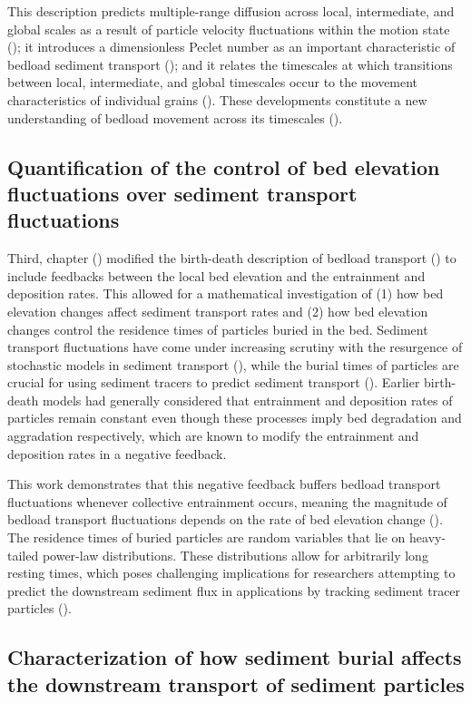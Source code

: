 This description predicts multiple-range diffusion across local, intermediate, and global scales as a result of particle velocity fluctuations within the motion state (); it introduces a dimensionless Peclet number as an important characteristic of bedload sediment transport (); and it relates the timescales at which transitions between local, intermediate, and global timescales occur to the movement characteristics of individual grains ().
These developments constitute a new understanding of bedload movement across its timescales ().

\subsection{Quantification of the control of bed elevation fluctuations over sediment transport fluctuations}

Third, chapter () modified the birth-death description of bedload transport () to include feedbacks between the local bed elevation and the entrainment and deposition rates.
This allowed for a mathematical investigation of (1) how bed elevation changes affect sediment transport rates and (2) how bed elevation changes control the residence times of particles buried in the bed.
Sediment transport fluctuations have come under increasing scrutiny with the resurgence of stochastic models in sediment transport (), while the burial times of particles are crucial for using sediment tracers to predict sediment transport ().
Earlier birth-death models had generally considered that entrainment and deposition rates of particles remain constant even though these processes imply bed degradation and aggradation respectively, which are known to modify the entrainment and deposition rates in a negative feedback.

This work demonstrates that this negative feedback buffers bedload transport fluctuations whenever collective entrainment occurs, meaning the magnitude of bedload transport fluctuations depends on the rate of bed elevation change (). The residence times of buried particles are random variables that lie on heavy-tailed power-law distributions. These distributions allow for arbitrarily long resting times, which poses challenging implications for researchers attempting to predict the downstream sediment flux in applications by tracking sediment tracer particles (). 

\subsection{Characterization of how sediment burial affects the downstream transport of sediment particles}

